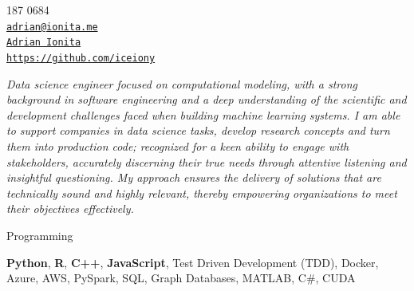 \documentclass[11pt,article,oneside]{memoir}
\makeatletter
\def\myauthor{Adrian Ionita}
\def\myemail{adrian@ionita.me}
\def\myweb{https://github.com/iceiony}
\def\myphone{0797 187 0684}
\def\mytwitter{@iceiony}
\def\mylinkedin{https://uk.linkedin.com/in/adrian-ionita-6a923129}
\makeatother
\begin{document}
%
\hfill
\begin{minipage}[t]{1.3in}
  \flushright \footnotesize  \contactblock \myphone \, \faPhone \\ 
  {\scriptsize  \texttt{\href{mailto:\myemail}{\myemail}} \, \faEnvelope} \\
  {\scriptsize  \texttt{\href{\mylinkedin}{\myauthor}} \, \faLinkedinSquare }  \\ 
  {\scriptsize  \texttt{\href{\myweb}{\myweb}} \, \faGithub}
\end{minipage}

{\vskip -0.8cm}
\reversemarginpar

\bigskip      
\medskip

\noindent\emph{Data science engineer focused on computational modeling, with a strong background in software engineering and a deep understanding of the scientific and development challenges faced when building machine learning systems.
I am able to support companies in data science tasks, develop research concepts and turn them into production code; recognized for a keen ability to engage with stakeholders, accurately discerning their true needs through attentive listening and insightful questioning.
My approach ensures the delivery of solutions that are technically sound and highly relevant, thereby empowering organizations to meet their objectives effectively.
}
\bigskip


\ind Programming

\ind \hspace{0.354in} \footnotesize \textbf{Python}, \textbf{R}, \textbf{C++}, \textbf{JavaScript}, Test Driven Development (TDD), Docker, Azure, AWS, PySpark, SQL, Graph Databases, MATLAB, C\#, CUDA \normalsize 
\end{document}
